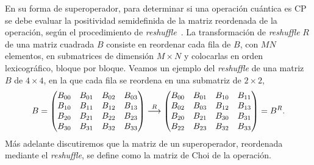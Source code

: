 En su forma de superoperador, para determinar si una operación cuántica es CP
se debe evaluar la positividad semidefinida de la matriz reordenada 
de la operación, según el procedimiento de
\textit{reshuffle}~\cite{bengtsson_zyczkowski_2017}.
La transformación de \textit{reshuffle} $R$ de una matriz cuadrada $B$ 
consiste en reordenar cada fila de $B$, con $MN$ elementos, 
en submatrices de dimensión $M\times N$ y colocarlas en 
orden lexicográfico, bloque por bloque. Veamos un ejemplo del 
\textit{reshuffle} de una matriz $B$ de $4\times 4$, en la que 
cada fila se reordena en una submatriz de $2\times 2$,
\begin{align}
B=
\mqty(
B_{00}&B_{01}&B_{02}&B_{03}\\
B_{10}&B_{11}&B_{12}&B_{13}\\
B_{20}&B_{21}&B_{22}&B_{23}\\
B_{30}&B_{31}&B_{32}&B_{33})
\stackrel{R}{\longrightarrow}
\mqty(
B_{00}&B_{01}&B_{10}&B_{11}\\
B_{02}&B_{03}&B_{12}&B_{13}\\
B_{20}&B_{21}&B_{30}&B_{31}\\
B_{22}&B_{23}&B_{32}&B_{33})
=B^R.
\label{eq:reshuffle}
\end{align}
Más adelante discutiremos que la matriz de un superoperador, 
reordenada mediante el \textit{reshuffle}, se define como la matriz de Choi
de la operación.

